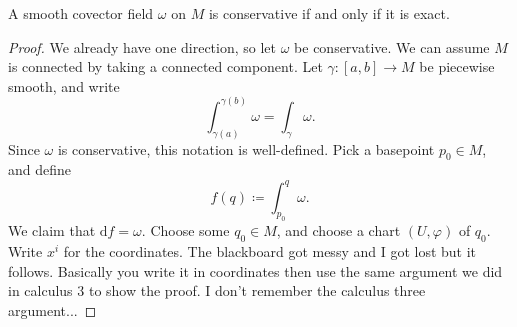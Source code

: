 \begin{theorem}\label{3.1.12}
	A smooth covector field $\omega $ on $M$ is conservative if and only if it is exact.
\end{theorem}
\begin{proof}
	We already have one direction, so let $\omega $ be conservative. We can assume $M$ is connected by taking a connected component. Let $\gamma : [a,b] \to M$ be piecewise smooth, and write
	\[
		\int_{\gamma (a)}^{\gamma (b)} \omega =\int_\gamma \omega
	.\]
	Since $\omega $ is conservative, this notation is well-defined. Pick a basepoint $p_0\in M$, and define
	\[
		f(q)\coloneqq \int_{p_0} ^q\omega
	.\]
	We claim that $\mathrm{d} f=\omega $. Choose some $q_0\in M$, and choose a chart $(U,\varphi )$ of $q_0$. Write $x^i$ for the coordinates. The blackboard got messy and I got lost but it follows. Basically you write it in coordinates then use the same argument we did in calculus 3 to show the proof. I don't remember the calculus three argument...
\end{proof}

